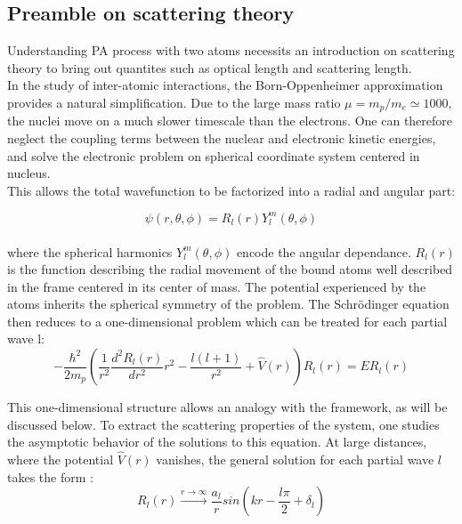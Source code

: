 \subsection{Preamble on scattering theory}
Understanding PA process with two atoms necessits an introduction on scattering theory to bring out quantites such 
as optical length and scattering length.\\
In the study of inter-atomic interactions, the Born-Oppenheimer approximation provides a natural 
simplification. Due to the large mass ratio $\mu = m_p/m_e \simeq 1000$, the nuclei move on a much 
slower timescale than the electrons. One can therefore neglect the coupling terms between the nuclear 
and electronic kinetic energies, and solve the electronic problem on spherical coordinate system centered
in nucleus.\\
This allows the total wavefunction to be factorized into a radial and angular part:

\begin{equation}
    \psi(r, \theta,\phi) = R_l(r) Y^m_l(\theta, \phi)
\end{equation}
\\
where the spherical harmonics $Y^m_l(\theta, \phi)$ encode the angular dependance.
$R_l(r)$ is the function describing the radial movement of the bound atoms well described in the frame centered 
in its center of mass. The potential experienced by the atoms inherits the spherical symmetry of the problem. 
The Schr\"odinger equation then reduces to a one-dimensional problem which can be treated for each
partial wave l:
\begin{equation}
    -\frac{\hbar^2}{2m_p}\left(\frac{1}{r^2} \frac{d^2 R_l(r)}{dr^2}r^2 - \frac{l(l+1)}{r^2} 
    + \hat{V}(r)\right)R_l(r) = E R_l(r)
    \label{radial equation}
\end{equation}

This one-dimensional structure allows an analogy with the \cite{Landau} framework, as will be 
discussed below. To extract the scattering properties of the system, one studies the asymptotic 
behavior of the solutions to this equation. At large distances, where the potential $\hat{V}(r)$
vanishes, the general solution for each partial wave $l$ takes the form \cite{dalibard_interactions_nodate}:
\begin{equation}
    R_l(r) \xrightarrow{r\to\infty} \frac{a_l}{r}sin(kr-\frac{l\pi}{2} + \delta_l)
    \label{solution at long r}
\end{equation}

